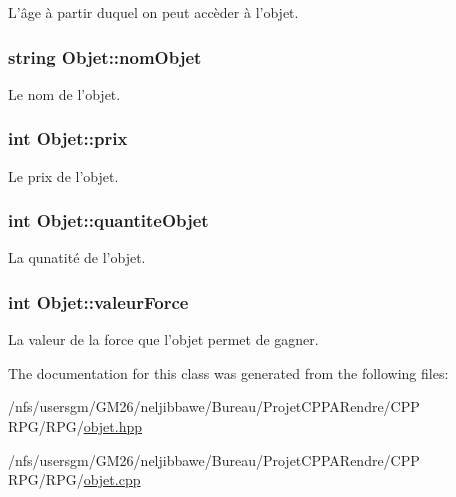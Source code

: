 L'âge à partir duquel on peut accèder à l'objet. 

\hypertarget{class_objet_aeae2038324beeebfdd3ef7f793ca0b21}{
\subsubsection[{nom\-Objet}]{\setlength{\rightskip}{0pt plus 5cm}string Objet\-::nom\-Objet\hspace{0.3cm}{\ttfamily [protected]}}}\label{class_objet_aeae2038324beeebfdd3ef7f793ca0b21}


Le nom de l'objet. 

\hypertarget{class_objet_abdcebe17a8c444c7e3c982d5d99930cd}{
\subsubsection[{prix}]{\setlength{\rightskip}{0pt plus 5cm}int Objet\-::prix\hspace{0.3cm}{\ttfamily [protected]}}}\label{class_objet_abdcebe17a8c444c7e3c982d5d99930cd}


Le prix de l'objet. 

\hypertarget{class_objet_a97d1fa595a507f7c06f241d73c63bb94}{
\subsubsection[{quantite\-Objet}]{\setlength{\rightskip}{0pt plus 5cm}int Objet\-::quantite\-Objet\hspace{0.3cm}{\ttfamily [protected]}}}\label{class_objet_a97d1fa595a507f7c06f241d73c63bb94}


La qunatité de l'objet. 

\hypertarget{class_objet_aa819b02977c333c0cc5e116575e951cc}{
\subsubsection[{valeur\-Force}]{\setlength{\rightskip}{0pt plus 5cm}int Objet\-::valeur\-Force\hspace{0.3cm}{\ttfamily [protected]}}}\label{class_objet_aa819b02977c333c0cc5e116575e951cc}


La valeur de la force que l'objet permet de gagner. 



The documentation for this class was generated from the following files\-:\begin{DoxyCompactItemize}
\item 
/nfs/usersgm/\-G\-M26/neljibbawe/\-Bureau/\-Projet\-C\-P\-P\-A\-Rendre/\-C\-P\-P R\-P\-G/\-R\-P\-G/\hyperlink{objet_8hpp}{objet.\-hpp}\item 
/nfs/usersgm/\-G\-M26/neljibbawe/\-Bureau/\-Projet\-C\-P\-P\-A\-Rendre/\-C\-P\-P R\-P\-G/\-R\-P\-G/\hyperlink{objet_8cpp}{objet.\-cpp}\end{DoxyCompactItemize}
